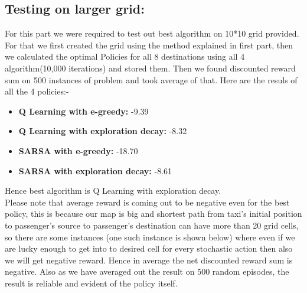 \documentclass{article}
\begin{document}
\begin{enumerate}[a)]
\begin{enumerate}
    
\end{enumerate}


\subsection{Testing on larger grid:}
For this part we were required to test out best algorithm on 10*10 grid provided. For that we first created the grid using the method explained in first part, then we calculated the optimal Policies for all 8 destinations using all 4 algorithm(10,000 iterations) and stored them. Then we found discounted reward sum on 500 instances of problem and took average of that.
Here are the resuls of all the 4 policies:- 
\begin{itemize}
    \item \textbf{Q Learning with e-greedy: } -9.39
    \item \textbf{Q Learning with exploration decay: }  -8.32
    \item \textbf{SARSA with e-greedy: }  -18.70
    \item \textbf{SARSA with exploration decay: } -8.61
\end{itemize}

Hence best algorithm is Q Learning with exploration decay.\\

Please note that average reward is coming out to be negative even for the best policy, this is because our map is big and shortest path from taxi's initial position to passenger's source to passenger's destination can have
more than 20 grid cells, so there are some instances (one such instance is shown below) where even if we are lucky enough to get into to desired cell for every stochastic action then also we will get negative reward. Hence in average the net discounted reward sum is negative.
Also as we have averaged out the result on 500 random episodes, the result is reliable and evident of the policy itself.



\end{enumerate}
\end{document}
